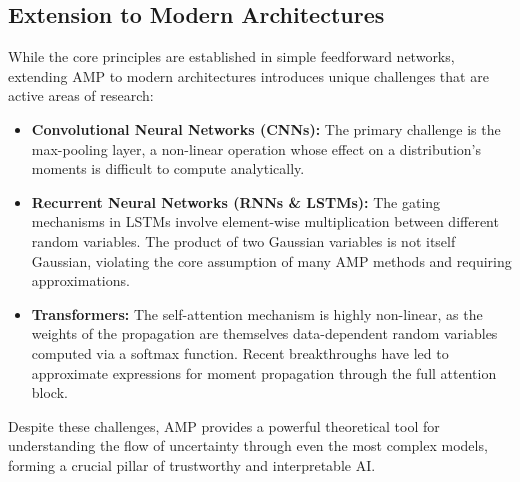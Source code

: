 \subsection{Extension to Modern Architectures}
While the core principles are established in simple feedforward networks, extending AMP to modern architectures introduces unique challenges that are active areas of research:
\begin{itemize}
    \item \textbf{Convolutional Neural Networks (CNNs):} The primary challenge is the max-pooling layer, a non-linear operation whose effect on a distribution's moments is difficult to compute analytically.
    \item \textbf{Recurrent Neural Networks (RNNs \& LSTMs):} The gating mechanisms in LSTMs involve element-wise multiplication between different random variables. The product of two Gaussian variables is not itself Gaussian, violating the core assumption of many AMP methods and requiring approximations.
    \item \textbf{Transformers:} The self-attention mechanism is highly non-linear, as the weights of the propagation are themselves data-dependent random variables computed via a softmax function. Recent breakthroughs have led to approximate expressions for moment propagation through the full attention block.
\end{itemize}
Despite these challenges, AMP provides a powerful theoretical tool for understanding the flow of uncertainty through even the most complex models, forming a crucial pillar of trustworthy and interpretable AI.

\ifdefined\ispartofbook
\else
  
  
\fi
